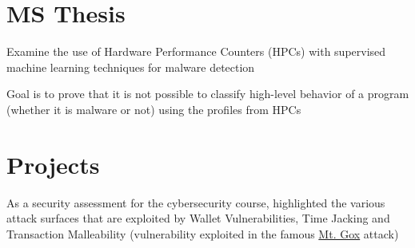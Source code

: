 \documentclass[]{deedy_format_Anmol}
\begin{document}
\begin{minipage}[t]{0.66\textwidth}

\section{MS Thesis}
\vspace{0.5mm} %
\vspace{1mm}
\justify
\begin{tightemize}
\item Examine the use of Hardware Performance Counters (HPCs) with supervised machine learning techniques for malware detection 
\item Goal is to prove that it is not possible to classify high-level behavior of a program (whether it is malware or not) using the profiles from HPCs
\end{tightemize}
\vspace{\topsep}
\sectionsep



\section{Projects}
\vspace{0.5mm} %

\vspace{1mm}
\justify
\begin{tightemize}
\item As a security assessment for the cybersecurity course, highlighted the various attack surfaces that are exploited by Wallet Vulnerabilities, Time Jacking and Transaction Malleability (vulnerability exploited in the famous \href{http://www.darkreading.com/attacks-and-breaches/mt-gox-bitcoin-meltdown-what-went-wrong/d/d-id/1114091}{Mt. Gox} attack)	
\end{tightemize}
\vspace{\topsep}
\sectionsep



\end{minipage}
\end{document}
